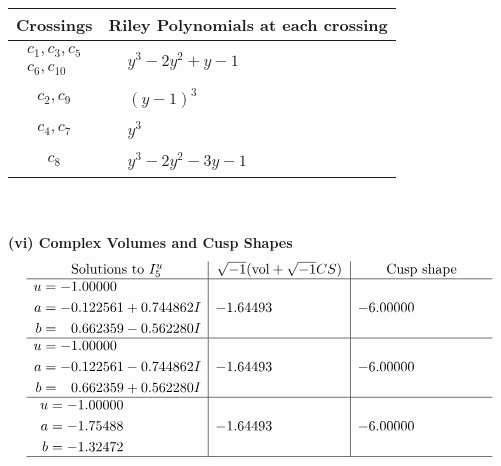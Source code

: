 \documentclass[1p]{elsarticle_modified}
\theoremstyle{definition}
\newcommand{\I}{\sqrt{-1}}
\begin{document}
\begin{tabular}{m{50pt}|m{274pt}}
Crossings & \hspace{64pt}Riley Polynomials at each crossing \\
\hline $$\begin{aligned}c_{1},c_{3},c_{5}\\c_{6},c_{10}\end{aligned}$$&$\begin{aligned}
&y^3-2 y^2+y-1
\end{aligned}$\\
\hline $$\begin{aligned}c_{2},c_{9}\end{aligned}$$&$\begin{aligned}
&(y-1)^3
\end{aligned}$\\
\hline $$\begin{aligned}c_{4},c_{7}\end{aligned}$$&$\begin{aligned}
&y^3
\end{aligned}$\\
\hline $$\begin{aligned}c_{8}\end{aligned}$$&$\begin{aligned}
&y^3-2 y^2-3 y-1
\end{aligned}$\\
\hline
\end{tabular}\\~\\
\newpage\flushleft \textbf{(vi) Complex Volumes and Cusp Shapes}
$$\begin{array}{c|c|c}  
\text{Solutions to }I^u_{5}& \I (\text{vol} + \sqrt{-1}CS) & \text{Cusp shape}\\
 \hline 
\begin{aligned}
u &= -1.00000\phantom{ +0.000000I} \\
a &= -0.122561 + 0.744862 I \\
b &= \phantom{-}0.662359 - 0.562280 I\end{aligned}
 & -1.64493\phantom{ +0.000000I} & -6.00000\phantom{ +0.000000I} \\ \hline\begin{aligned}
u &= -1.00000\phantom{ +0.000000I} \\
a &= -0.122561 - 0.744862 I \\
b &= \phantom{-}0.662359 + 0.562280 I\end{aligned}
 & -1.64493\phantom{ +0.000000I} & -6.00000\phantom{ +0.000000I} \\ \hline\begin{aligned}
u &= -1.00000\phantom{ +0.000000I} \\
a &= -1.75488\phantom{ +0.000000I} \\
b &= -1.32472\phantom{ +0.000000I}\end{aligned}
 & -1.64493\phantom{ +0.000000I} & -6.00000\phantom{ +0.000000I}\\
 \hline 
 \end{array}$$\newpage\newpage\renewcommand{\arraystretch}{1}
\end{document}
